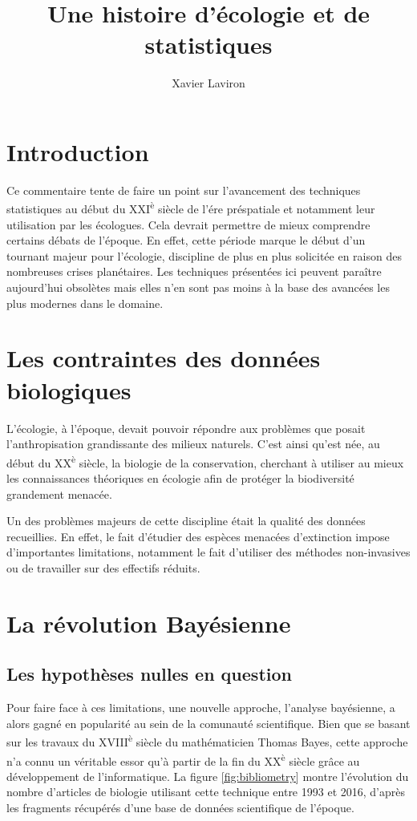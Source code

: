 \documentclass[11pt,twocolumn,twoside]{bopHomework}
\title{Une histoire d'écologie et de statistiques}
\author[1,*]{Xavier Laviron}
\affil[1]{Département des publications (BOP2), Société de publication de
  l'Encyclopedia Galactica, Presses de Terminus}
\affil[*]{Contact : xavier.laviron@gmx.fr}
\begin{document}
\maketitle

\section{Introduction}

Ce commentaire tente de faire un point sur l'avancement des techniques
statistiques au début du XXI\textsuperscript{è} siècle de l'ére préspatiale et
notamment leur utilisation par les écologues.
Cela devrait permettre de mieux comprendre certains débats de l'époque.
En effet, cette période marque le début d'un tournant majeur pour l'écologie,
discipline de plus en plus solicitée en raison des nombreuses crises
planétaires.
Les techniques présentées ici peuvent paraître aujourd'hui obsolètes mais elles
n'en sont pas moins à la base des avancées les plus modernes dans le domaine.


\section{Les contraintes des données biologiques}

L'écologie, à l'époque, devait pouvoir répondre aux problèmes que posait
l'anthropisation grandissante des milieux naturels.
C'est ainsi qu'est née, au début du XX\textsuperscript{è} siècle, la biologie de
la conservation, cherchant à utiliser au mieux les connaissances théoriques en
écologie afin de protéger la biodiversité grandement menacée.

Un des problèmes majeurs de cette discipline était la qualité des données
recueillies.
En effet, le fait d'étudier des espèces menacées d'extinction impose
d'importantes limitations, notamment le fait d'utiliser des méthodes
non-invasives ou de travailler sur des effectifs réduits.


\section{La révolution Bayésienne}
\subsection{Les hypothèses nulles en question}

Pour faire face à ces limitations, une nouvelle approche, l'analyse bayésienne,
a alors gagné en popularité au sein de la comunauté scientifique.
Bien que se basant sur les travaux du XVIII\textsuperscript{è} siècle du
mathématicien Thomas Bayes, cette approche n'a connu un véritable essor qu'à
partir de la fin du XX\textsuperscript{è} siècle grâce au développement de
l'informatique.
La figure \ref{fig:bibliometry} montre l'évolution du nombre d'articles de
biologie utilisant cette technique entre 1993 et 2016, d'après les fragments
récupérés d'une base de données scientifique de l'époque.
\end{document}
